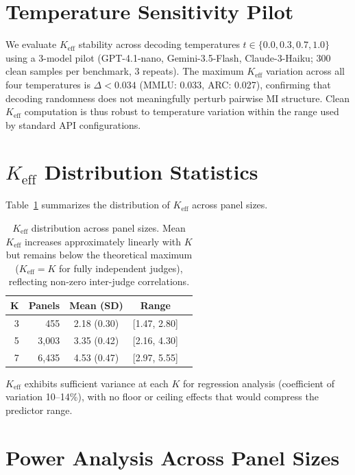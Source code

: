 \section{Temperature Sensitivity Pilot}
\label{app:temperature}

We evaluate $K_{\mathrm{eff}}$ stability across decoding temperatures $t \in \{0.0, 0.3, 0.7, 1.0\}$ using a 3-model pilot (GPT-4.1-nano, Gemini-3.5-Flash, Claude-3-Haiku; 300 clean samples per benchmark, 3 repeats). The maximum $K_{\mathrm{eff}}$ variation across all four temperatures is $\Delta < 0.034$ (MMLU: 0.033, ARC: 0.027), confirming that decoding randomness does not meaningfully perturb pairwise MI structure. Clean $K_{\mathrm{eff}}$ computation is thus robust to temperature variation within the range used by standard API configurations.

\section{$K_{\mathrm{eff}}$ Distribution Statistics}
\label{app:keff_dist}

Table~\ref{tab:keff_dist} summarizes the distribution of $K_{\mathrm{eff}}$ across panel sizes.

\begin{table}[h]
\centering
\small
\begin{tabular}{rrccc}
\toprule
$\boldsymbol{K}$ & \textbf{Panels} & \textbf{Mean (SD)} & \textbf{Range} \\
\midrule
3 & 455     & 2.18 (0.30) & [1.47, 2.80] \\
5 & 3{,}003 & 3.35 (0.42) & [2.16, 4.30] \\
7 & 6{,}435 & 4.53 (0.47) & [2.97, 5.55] \\
\bottomrule
\end{tabular}
\caption{$K_{\mathrm{eff}}$ distribution across panel sizes. Mean $K_{\mathrm{eff}}$ increases approximately linearly with $K$ but remains below the theoretical maximum ($K_{\mathrm{eff}} = K$ for fully independent judges), reflecting non-zero inter-judge correlations.}
\label{tab:keff_dist}
\end{table}

$K_{\mathrm{eff}}$ exhibits sufficient variance at each $K$ for regression analysis (coefficient of variation 10--14\%), with no floor or ceiling effects that would compress the predictor range.

\section{Power Analysis Across Panel Sizes}
\label{app:power_analysis}

